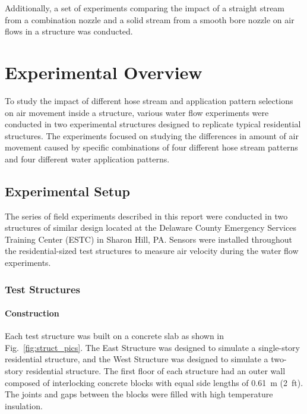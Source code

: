 \documentclass[12pt,oneside]{book}
\begin{document}
Additionally, a set of experiments comparing the impact of a straight stream from a combination nozzle and a solid stream from a smooth bore nozzle on air flows in a structure was conducted.

\FloatBarrier

\chapter{Experimental Overview}
\label{chap:exp_overview}
To study the impact of different hose stream and application pattern selections on air movement inside a structure, various water flow experiments were conducted in two experimental structures designed to replicate typical residential structures. The experiments focused on studying the differences in amount of air movement caused by specific combinations of four different hose stream patterns and four different water application patterns.

\section{Experimental Setup}
\label{sec:exp_setup}
The series of field experiments described in this report were conducted in two structures of similar design located at the Delaware County Emergency Services Training Center (ESTC) in Sharon Hill, PA. Sensors were installed throughout the residential-sized test structures to measure air velocity during the water flow experiments.  

\subsection{Test Structures}
\label{sec:test_structs}

\subsubsection{Construction}
\label{sec:construction}
Each test structure was built on a concrete slab as shown in Fig.~\ref{fig:struct_pics}. The East Structure was designed to simulate a single-story residential structure, and the West Structure was designed to simulate a two-story residential structure. The first floor of each structure had an outer wall composed of interlocking concrete blocks with equal side lengths of 0.61~m (2~ft). The joints and gaps between the blocks were filled with high temperature insulation.
\end{document}
